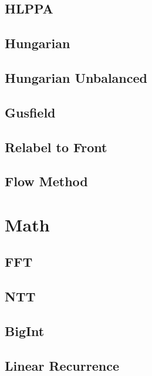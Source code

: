 \documentclass[10pt,twocolumn,oneside]{article}
\begin{document}
\subsection{HLPPA}


\subsection{Hungarian}


\subsection{Hungarian Unbalanced}


\subsection{Gusfield}


\subsection{Relabel to Front}


\subsection{Flow Method}


\section{Math}
\subsection{FFT}


\subsection{NTT}


\subsection{BigInt}


\subsection{Linear Recurrence}

\end{document}

